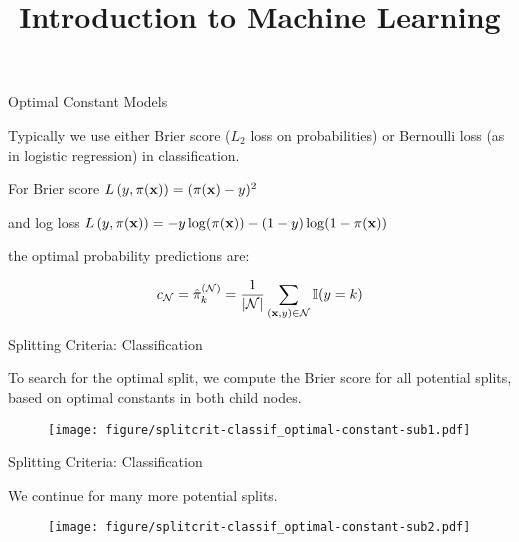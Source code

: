 \documentclass[11pt,compress,t,notes=noshow, xcolor=table]{beamer}
\title{Introduction to Machine Learning}
\institute{\href{https://compstat-lmu.github.io/lecture_i2ml/}{compstat-lmu.github.io/lecture\_i2ml}}
\date{}
\begin{document}
\sloppy

\begin{vbframe}{Optimal Constant Models}

Typically we use either Brier score ($L_2$ loss on probabilities) or  Bernoulli loss (as in logistic regression) in classification.

\vspace{0.5cm}
For Brier score $L\left(y, \pi(\mathbf{x})\right) = (\pi(\mathbf{x}) - y)^2$
\vspace{0.5cm}

and log loss $L\left(y, \pi(\mathbf{x})\right) = -y\log(\pi(\mathbf{x}))-(1-y)\log(1-\pi(\mathbf{x}))$
\vspace{0.5cm}

the optimal probability predictions are:

$$c_{\mathcal{N}} = \hat\pi_k^{(\mathcal{N})} = \frac{1}{|\mathcal{N}|} \sum\limits_{(\mathbf{x},y) \in \mathcal{N}} \mathbb{I}(y = k)$$ 



\end{vbframe}


\begin{frame}[b]{Splitting Criteria: Classification}

To search for the optimal split, we compute the Brier score for all potential splits, based on optimal constants in both child nodes.

\vspace{0.5cm}

\begin{figure}[b]
    \centering
  \texttt{[image: figure/splitcrit-classif\_optimal-constant-sub1.pdf]}
\end{figure}


\end{frame}

\begin{frame}[b]{Splitting Criteria: Classification}

We continue for many more potential splits.

\vspace{0.8cm}

\begin{figure}[b]
    \centering
  \texttt{[image: figure/splitcrit-classif\_optimal-constant-sub2.pdf]}
\end{figure}


\end{frame}
\end{document}
